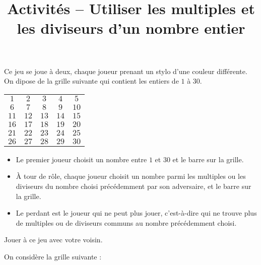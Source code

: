 \documentclass[a4paper]{article}
\begin{document}
\title{Activités -- Utiliser les multiples et les diviseurs d'un nombre entier}

\pagestyle{empty}

\date{}
\author{}

\maketitle{}

 Ce jeu se joue à deux, chaque joueur prenant un stylo d'une couleur différente.\\
On dipose de la grille suivante qui contient les entiers de $1$ à $30$.

\begin{center}
  \Large
  \begin{tabular}{@{}|c|c|c|c|c|@{}}
    \toprule
    $1$ & $2$ & $3$ & $4$ & $5$\\
    $6$ & $7$ & $8$ & $9$ & $10$\\
    $11$ & $12$ & $13$ & $14$ & $15$\\
    $16$ & $17$ & $18$ & $19$ & $20$\\
    $21$ & $22$ & $23$ & $24$ & $25$\\
    $26$ & $27$ & $28$ & $29$ & $30$\\
    \bottomrule
  \end{tabular}
\end{center}

\begin{itemize}
  \item Le premier joueur choisit un nombre entre $1$ et $30$ et le barre sur la grille.
  \item À tour de rôle, chaque joueur choisit un nombre parmi les multiples ou les diviseurs du nombre choisi précédemment par son adversaire, et le barre sur la grille.
  \item Le perdant est le joueur qui ne peut plus jouer, c'est-à-dire qui ne trouve plus de multiples ou de diviseurs communs au nombre précédemment choisi.
\end{itemize}

Jouer à ce jeu avec votre voisin.

\bigskip

 On considère la grille suivante :
\end{document}
